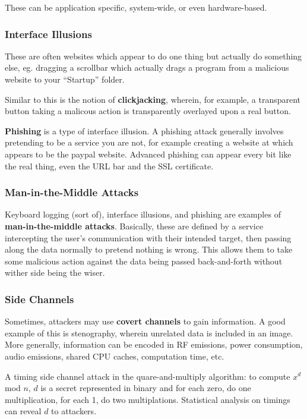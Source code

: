 \documentclass[12pt]{article}
\begin{document}
These can be application specific, system-wide, or even hardware-based.

\subsubsection{Interface Illusions}
These are often websites which appear to do one thing but actually do something else, eg. dragging a scrollbar which actually drags a program from a malicious website to your ``Startup'' folder.

Similar to this is the notion of {\bf clickjacking}, wherein, for example, a transparent button taking a malicous action is transparently overlayed upon a real button.

{\bf Phishing} is a type of interface illusion. A phishing attack generally involves pretending to be a service you are not, for example creating a website at  which appears to be the paypal website. Advanced phishing can appear every bit like the real thing, even the URL bar and the SSL certificate.

\subsubsection{Man-in-the-Middle Attacks}
Keyboard logging (sort of), interface illusions, and phishing are examples of {\bf man-in-the-middle attacks}. Basically, these are defined by a service intercepting the user's communication with their intended target, then passing along the data normally to pretend nothing is wrong. This allows them to take some malicious action against the data being passed back-and-forth without wither side being the wiser.

\subsubsection{Side Channels}
Sometimes, attackers may use {\bf covert channels} to gain information. A good example of this is stenography, wherein unrelated data is included in an image. More generally, information can be encoded in RF emissions, power consumption, audio emissions, shared CPU caches, computation time, etc.

A timing side channel attack in the quare-and-multiply algorithm: to compute $x^d$ mod $n$, $d$ is a secret represented in binary and for each zero, do one multiplication, for each 1, do two multiplations. Statistical analysis on timings can reveal $d$ to attackers.
\end{document}
